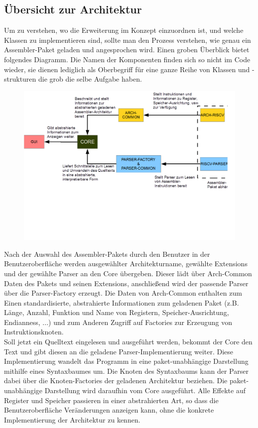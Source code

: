 \subsection{Übersicht zur Architektur}
Um zu verstehen, wo die Erweiterung im Konzept einzuordnen ist, und welche Klassen zu implementieren sind, sollte man den Prozess verstehen, wie genau ein Assembler-Paket geladen und angesprochen wird. Einen groben Überblick bietet folgendes Diagramm. Die Namen der Komponenten finden sich so nicht im Code wieder, sie dienen lediglich als Oberbegriff für eine ganze Reihe von Klassen und -strukturen die grob die selbe Aufgabe haben.
\begin{figure}
	\centering
	\includegraphics[scale=0.5]{charts/extension-overview.png}
	\label{dev-manual-extension-overview}
\end{figure}
Nach der Auswahl des Assembler-Pakets durch den Benutzer in der Benutzeroberfläche werden ausgewählter Architekturname, gewählte Extensions und der gewählte Parser an den Core übergeben. Dieser lädt über Arch-Common Daten des Pakets und seinen Extensions, anschließend wird der passende Parser über die Parser-Factory erzeugt. Die Daten von Arch-Common enthalten zum Einen standardisierte, abstrahierte Informationen zum geladenen Paket (z.B. Länge, Anzahl, Funktion und Name von Registern, Speicher-Ausrichtung, Endianness, ...) und zum Anderen Zugriff auf Factories zur Erzeugung von Instruktionsknoten.\\
Soll jetzt ein Quelltext eingelesen und ausgeführt werden, bekommt der Core den Text und gibt diesen an die geladene Parser-Implementierung weiter. Diese Implementierung wandelt das Programm in eine paket-unabhängige Darstellung mithilfe eines Syntaxbaumes um. Die Knoten des Syntaxbaums kann der Parser dabei über die Knoten-Factories der geladenen Architektur beziehen. Die paket-unabhängige Darstellung wird daraufhin vom Core ausgeführt. Alle Effekte auf Register und Speicher passieren in einer abstrahierten Art, so dass die Benutzeroberfläche Veränderungen anzeigen kann, ohne die konkrete Implementierung der Architektur zu kennen.\\

